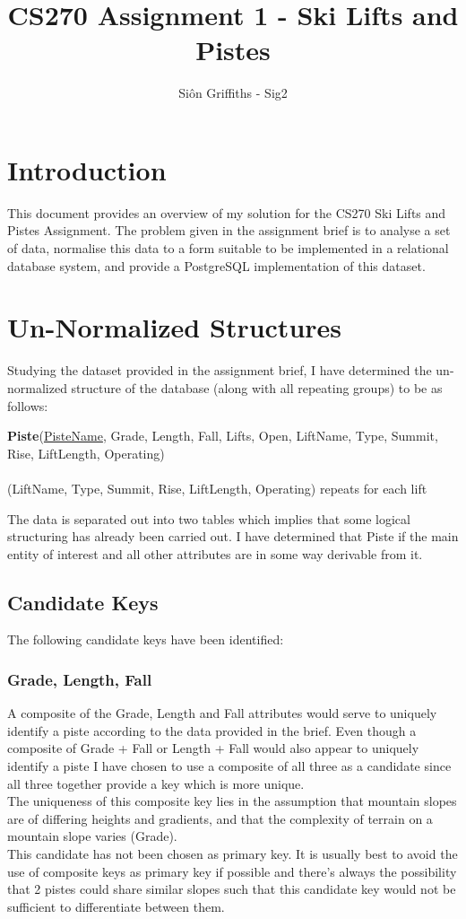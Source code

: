 \documentclass[titlepage ,12pt]{article}
\title{CS270 Assignment 1 - Ski Lifts and Pistes}
\author{Si\^{o}n Griffiths - Sig2}
\begin{document}
\maketitle
\newpage
\tableofcontents
\clearpage


\section{Introduction}
This document provides an overview of my solution for the CS270 Ski Lifts and Pistes Assignment.
The problem given in the assignment brief is to analyse a set of data, normalise this data to a form suitable to be implemented in a relational database system, and provide a PostgreSQL implementation of this dataset.   

\section{Un-Normalized Structures}

Studying the dataset provided in the assignment brief, I have determined the un-normalized structure of the database (along with all repeating groups) to be as follows:
 
\textbf{Piste}(\underline{PisteName}, Grade, Length, Fall, Lifts, Open, LiftName, Type, Summit, Rise, LiftLength, Operating) \\ \\
(LiftName, Type, Summit, Rise, LiftLength, Operating) repeats for each lift
 \newline

The data is separated out into two tables which implies that some logical structuring has already been carried out. I have determined that Piste if the main entity of interest and all other attributes are in some way derivable from it. 

\subsection{Candidate Keys}
The following candidate keys have been identified: 

\subsubsection{Grade, Length, Fall}

A composite of the Grade, Length and Fall attributes would serve to uniquely identify a piste according to the data provided in the brief. Even though a composite of Grade + Fall or Length + Fall would also appear to uniquely identify a piste I have chosen to use a composite of all three as a candidate since all three together provide a key which is more unique. \\
The uniqueness of this composite key lies in the assumption that mountain slopes are of differing heights and gradients, and that the complexity of terrain on a mountain slope varies (Grade). \\
This candidate has not been chosen as primary key. It is usually best to avoid the use of composite keys as primary key if possible and there's always the possibility that 2 pistes could share similar slopes such that this candidate key would not be sufficient to differentiate between them.
\end{document}
